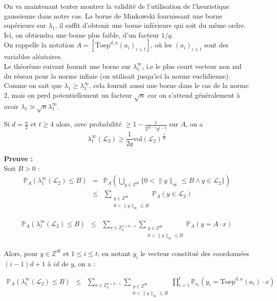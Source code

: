 \documentclass[11pt,a4paper]{article}
\begin{document}
On va maintenant tenter montrer la validité de l'utilisation de l'heuristique gaussienne dans notre cas. La borne de Minkowski fournissant une borne supérieure sur $\lambda_1$, il suffit d'obtenir une borne inférieure qui soit du même ordre. Ici, on obtiendra une borne plus faible, d'un facteur $1/q$.  \\ On rappelle la notation $A=[\text{Toep}^{d,n}(a_i)_{i\leq t}]$, où les $(a_i)_{i\leq t}$ sont des variables aléatoires. \\ Le théorème suivant fournit une borne sur $\lambda_1^\infty$, i.e le plus court vecteur non nul du réseau pour la norme infinie (on utilisait jusqu'ici la norme euclidienne). Comme on sait que $\lambda_1 \geq \lambda_1^\infty$, cela fournit aussi une borne dans le cas de la norme 2, mais on perd potentiellement un facteur $\sqrt{n}$ car on s'attend généralement à avoir  $\lambda_1 \simeq \sqrt{n} \lambda_1^\infty$.

\begin{theorem} Si $d=\frac{n}{2}$ et $t\geq 4$ alors, avec probabilité $\displaystyle \geq 1-\frac{1}{2^{td-1}q^{t-3}}$ sur $A$, on a \[\lambda_1^\infty(\mathcal{L}_2) \geq \frac{1}{2q} \text{vol}(\mathcal{L}_2)^{\frac{1}{dt}}\]
\end{theorem}

\textbf{Preuve :} \\
Soit $B > 0$ :
\begin{eqnarray*}
\mathbb{P}_A(\lambda_1^\infty(\mathcal{L}_2) \leq B) &=& \mathbb{P}_A( \bigcup_{y\in \mathbb{Z}^{dt}} \{0 < \|y\|_\infty \leq B \land y \in \mathcal{L}_2 \} ) \\
&\leq& \sum_{\substack{y \in \mathbb{Z}^{dt} \\ 0 < \|y\|_\infty \leq B}} \mathbb{P}_A(y \in \mathcal{L}_2) 
\end{eqnarray*}


\begin{eqnarray*}
\mathbb{P}_A(\lambda_1^\infty(\mathcal{L}_2) \leq B) &\leq&  \sum_{x \in \mathbb{Z}_q^{n+d-1}} \sum_{\substack{y \in \mathbb{Z}^{dt} \\ 0 < \|y\|_\infty \leq B}} \mathbb{P}_A(y=A\cdot x) 
\end{eqnarray*}

Alors, pour $y \in \mathbb{Z}^{dt}$ et $1 \leq i \leq t$, en notant $y_i$ le vecteur constitué des coordonnées $(i-1)d+1$ à $id$ de $y$, on a : 

\begin{eqnarray*}
\mathbb{P}_A(\lambda_1^\infty(\mathcal{L}_2) \leq B) &\leq& \sum_{x \in \mathbb{Z}_q^{n+d-1}} \sum_{\substack{y \in \mathbb{Z}^{dt} \\ 0 < \|y\|_\infty \leq B}} \prod_{i=1}^t \mathbb{P}_{a_i}(y_i =\text{Toep}^{d,n}(a_i) \cdot  x)
\end{eqnarray*}
\end{document}
